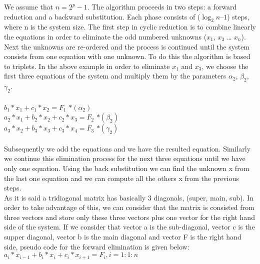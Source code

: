 We assume that $n= 2^p - 1$. 
The algorithm proceeds in two steps: a forward reduction and a backward substitution. Each phase consists of ($\log_2n – 1$) steps, where n is the system size. The first step in cyclic reduction is to combine linearly the equations in order to eliminate the odd numbered unknowns ($x_1$, $x_3$ … $x_n$). Next the unknowns are re-ordered and the process is continued until the system consists from one equation with one unknown. To do this the algorithm is based to triplets. In the above example in order to eliminate $x_1$ and $x_3$, we choose the first three equations of the system and multiply them by the parameters $\alpha_2$, $\beta_2$, $\gamma_2$. \\
\\
$b_1*x_1+c_1*x_2= F_1$                        \hspace*{5cm} $*(\alpha_2)$	\\
$a_2*x_1+ b_2*x_2+c_2*x_3= F_2$               \hspace*{3,3cm} $* (\beta_2)$  \\
\hspace*{2cm}$a_3*x_2+ b_3*x_3+c_3*x_4= F_3$  \hspace*{1,3cm} $*(\gamma_2)$     \\ \\
Subsequently we add the equations and we have the resulted equation. Similarly we continue this elimination process for the next three equations until we have only one equation.
Using the back substitution we can find the unknown x from the last one equation and we can compute all the others x from the previous steps.\\
As it is said a tridiagonal matrix has basically 3 diagonals, (super, main, sub). In order to take advantage of this, we can consider that the matrix is consisted from three vectors and store only these three vectors plus one vector for the right hand side of the system.
If we consider that vector a is the sub-diagonal, vector c is the supper diagonal, vector b is the main diagonal and vector F is the right hand side, pseudo code for the forward elimination is given below: \\
$a_i*x_{i-1} + b_i*x_i+c_i*x_{i+1} = F_{i}  ,   i=1:1:n$
